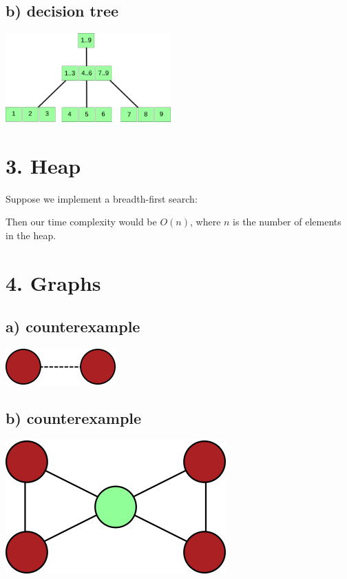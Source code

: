 \documentclass{article}
\begin{document}
\subsection*{b) decision tree}
\includegraphics[width=240px]{graphs/tree.png}


\section*{3. Heap}
Suppose we implement a breadth-first search:
\begin{algorithmic}
        \EndIf
    \EndFor
\EndWhile
\end{algorithmic}
Then our time complexity would be $O(n)$, where $n$ is the number of elements
in the heap.


\newpage
\section*{4. Graphs}
\subsection*{a) counterexample}
\includegraphics{graphs/4a.png}
\subsection*{b) counterexample}
\includegraphics{graphs/4b.png}
\end{document}
